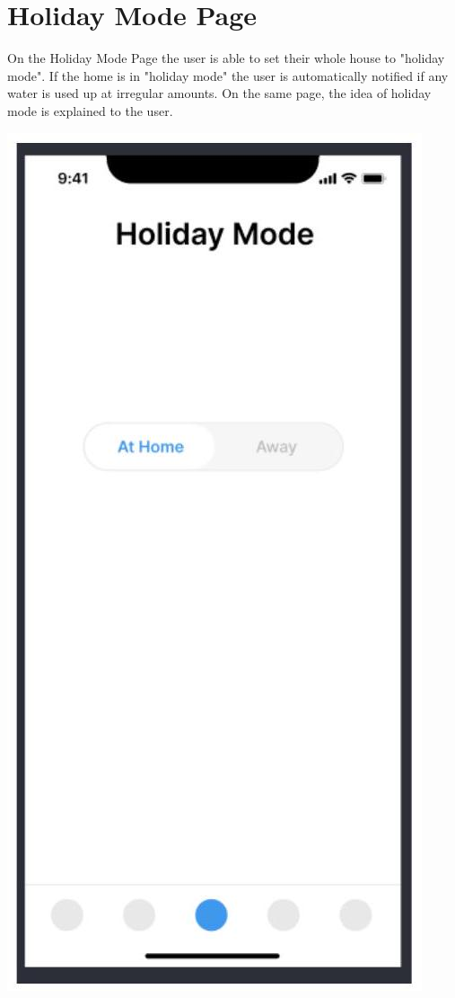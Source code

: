 \documentclass[10pt]{article}
\begin{document}
\section{Holiday Mode Page}
On the Holiday Mode Page the user is able to set their whole house to "holiday mode". If the home is in "holiday mode" the user is automatically notified if any water is used up at irregular amounts. On the same page, the idea of holiday mode is explained to the user.

\includegraphics[max width=\textwidth]{2022_11_16_e80008f3d60227bff292g-7}
\end{document}
